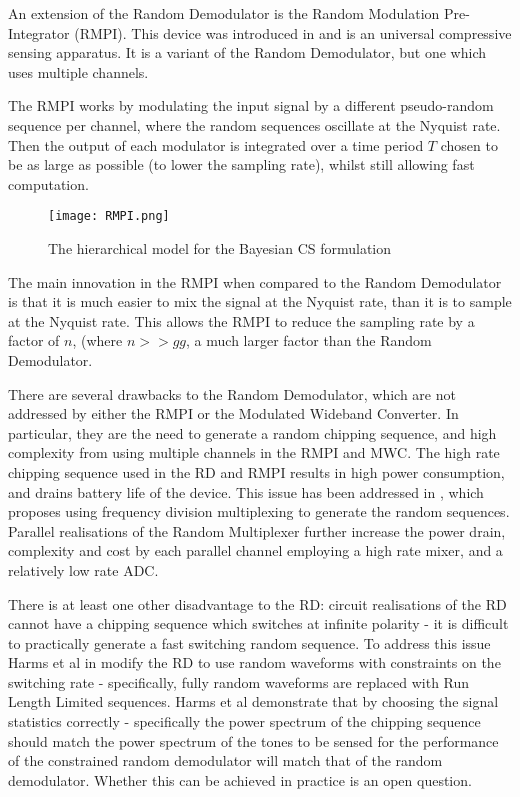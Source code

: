 An extension of the Random Demodulator is the Random Modulation Pre-Integrator (RMPI). This device was introduced in \cite{yoo2012design} and is an universal compressive sensing apparatus. It is a variant of the Random Demodulator, but one which uses multiple channels. 

The RMPI works by modulating the input signal by a different pseudo-random sequence per channel, where the random sequences oscillate at the Nyquist rate. Then the output of each modulator is integrated over a time period \(T\) chosen to be as large as possible (to lower the sampling rate), whilst still allowing fast computation. 

\begin{figure*}[h]
\centering
\texttt{[image: RMPI.png]}
\caption{The hierarchical model for the Bayesian CS formulation \cite{Ji2008}}
\label{bayesiancs}
\end{figure*}

The main innovation in the RMPI when compared to the Random Demodulator is that it is much easier to mix the signal at the Nyquist rate, than it is to sample at the Nyquist rate. This allows the RMPI to reduce the sampling rate by a factor of \(n\), (where \(n >> gg\), a much larger factor than the Random Demodulator. 

There are several drawbacks to the Random Demodulator, which are not addressed by either the RMPI or the Modulated Wideband Converter. In particular, they are the need to generate a random chipping sequence, and high complexity from using multiple channels in the RMPI and MWC. The high rate chipping sequence used in the RD and RMPI results in high power consumption, and drains battery life of the device. This issue has been addressed in \cite{massoud2011efficient}, which proposes using frequency division multiplexing to generate the random sequences. Parallel realisations of the Random Multiplexer further increase the power drain, complexity and cost by each parallel channel employing a high rate mixer, and a relatively low rate ADC. 

There is at least one other disadvantage to the RD: circuit realisations of the RD cannot have a chipping sequence which switches at infinite polarity - it is difficult to practically generate a fast switching random sequence. To address this issue Harms et al in  \cite{harms2013constrained} modify the RD to use random waveforms with constraints on the switching rate - specifically, fully random waveforms are replaced with Run Length Limited sequences. Harms et al demonstrate that by choosing the signal statistics correctly - specifically the power spectrum of the chipping sequence should match the power spectrum of the tones to be sensed for the performance of the constrained random demodulator will match that of the random demodulator. Whether this can be achieved in practice is an open question. 

